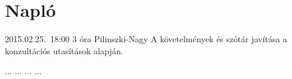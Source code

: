%
\section{Napló}

\begin{naplo}

\bejegyzes
{2015.02.25.~18:00} %
{3 óra} %
{Pilinszki-Nagy} %
{A követelmények és szótár javítása a konzultációs utasítások alapján.} %

\bejegyzes
{...}
{...}
{...}
{...}


\end{naplo}

